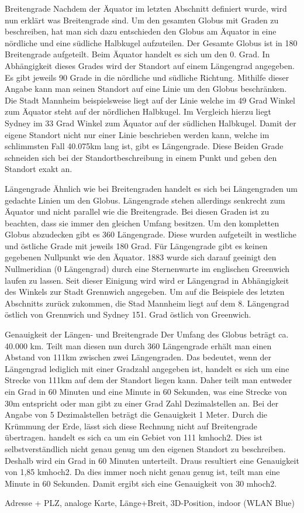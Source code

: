 Breitengrade
Nachdem der Äquator im letzten Abschnitt definiert wurde, wird nun erklärt was Breitengrade sind. Um den gesamten Globus mit Graden zu beschreiben, hat man sich dazu entschieden den Globus am Äquator in eine nördliche und eine südliche Halbkugel aufzuteilen. Der Gesamte Globus ist in 180 Breitengrade aufgeteilt. Beim Äquator handelt es sich um den 0. Grad. In Abhängigkeit dieses Grades wird der Standort auf einem Längengrad angegeben. Es gibt jeweils 90 Grade in die nördliche und südliche Richtung. Mithilfe dieser Angabe kann man seinen Standort auf eine Linie um den Globus beschränken. Die Stadt Mannheim beispielsweise liegt auf der Linie welche im 49 Grad Winkel zum Äquator steht auf der nördlichen Halbkugel. Im Vergleich hierzu liegt Sydney im 33 Grad Winkel zum Äquator auf der südlichen Halbkugel.
Damit der eigene Standort nicht nur einer Linie beschrieben werden kann, welche im schlimmsten Fall 40.075km lang ist, gibt es Längengrade. Diese Beiden Grade schneiden sich bei der Standortbeschreibung in einem Punkt und geben den Standort exakt an.

Längengrade
Ähnlich wie bei Breitengraden handelt es sich bei Längengraden um gedachte Linien um den Globus. Längengrade stehen allerdings senkrecht zum Äquator und nicht parallel wie die Breitengrade. Bei diesen Graden ist zu beachten, dass sie immer den gleichen Umfang besitzen. Um den kompletten Globus abzudecken gibt es 360 Längengrade. Diese wurden aufgeteilt in westliche und östliche Grade mit jeweils 180 Grad. Für Längengrade gibt es keinen gegebenen Nullpunkt wie den Äquator. 1883 wurde sich darauf geeinigt den Nullmeridian (0 Längengrad) durch eine Sternenwarte im englischen Greenwich laufen zu lassen. Seit dieser Einigung wird wird er Längengrad in Abhängigkeit des Winkels zur Stadt Grennwich angegeben. 
Um auf die Beispiele des letzten Abschnitts zurück zukommen, die Stad Mannheim liegt auf dem 8. Längengrad östlich von Grennwich und Sydney 151. Grad östlich von Greenwich.

Genauigkeit der Längen- und Breitengrade
Der Umfang des Globus beträgt ca. 40.000 km. Teilt man diesen nun durch 360 Längengrade erhält man einen Abstand von 111km zwischen zwei Längengraden. Das bedeutet, wenn der Längengrad  lediglich mit einer Gradzahl angegeben ist, handelt es sich um eine Strecke von 111km auf dem der Standort liegen kann. Daher teilt man entweder ein Grad in 60 Minuten und eine Minute in 60 Sekunden, was eine Strecke von 30m entspricht oder man gibt zu einer Grad Zahl Dezimalstellen an. Bei der Angabe von 5 Dezimalstellen beträgt die Genauigkeit 1 Meter.
Durch die Krümmung der Erde, lässt sich diese Rechnung nicht auf Breitengrade übertragen. 
handelt es sich ca um ein Gebiet von 111 kmhoch2. Dies ist selbstverständlich nicht genau genug um den eigenen Standort zu beschreiben. Deshalb wird ein Grad in 60 Minuten unterteilt. Draus resultiert eine Genauigkeit von 1,85 kmhoch2. Da dies immer noch nicht genau genug ist, teilt man eine Minute in 60 Sekunden. Damit ergibt sich eine Genauigkeit von 30 mhoch2. 


Adresse + PLZ, analoge Karte, Länge+Breit, 3D-Position, indoor (WLAN Blue)